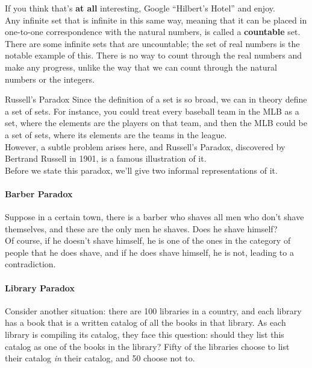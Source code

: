 If you think that's \textbf{at all} interesting, Google ``Hilbert's Hotel'' and enjoy.\\

Any infinite set that is infinite in this same way, meaning that it can be placed in one-to-one correspondence with the natural numbers, is called a \textbf{countable} set.  There are some infinite sets that are uncountable; the set of real numbers is the notable example of this.  There is no way to count through the real numbers and make any progress, unlike the way that we can count through the natural numbers or the integers.\\
\vfill
\pagebreak

\begin{proc}{Russell's Paradox}
Since the definition of a set is so broad, we can in theory define a set of sets.  For instance, you could treat every baseball team in the MLB as a set, where the elements are the players on that team, and then the MLB could be a set of sets, where its elements are the teams in the league.\\

However, a subtle problem arises here, and Russell's Paradox, discovered by Bertrand Russell in 1901, is a famous illustration of it.\\

Before we state this paradox, we'll give two informal representations of it.\\

\paragraph{Barber Paradox} Suppose in a certain town, there is a barber who shaves all men who don't shave themselves, and these are the only men he shaves.  Does he shave himself?\\

Of course, if he doesn't shave himself, he is one of the ones in the category of people that he does shave, and if he does shave himself, he is not, leading to a contradiction.\\

\paragraph{Library Paradox} Consider another situation: there are 100 libraries in a country, and each library has a book that is a written catalog of all the books in that library.  As each library is compiling its catalog, they face this question: should they list this catalog as one of the books in the library?  Fifty of the libraries choose to list their catalog \emph{in} their catalog, and 50 choose not to.\\


\end{proc}
